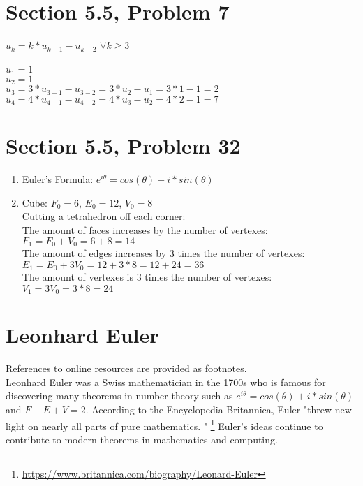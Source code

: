 \documentclass{article}
\begin{document}
\clearpage
\header
\section*{Section 5.5, Problem 7}
$u_k=k*u_{k-1}-u_{k-2}$ $\forall k \geq 3$ \\\\
$u_1=1$ \\
$u_2=1$ \\
$u_3=3*u_{3-1}-u_{3-2}=3*u_2-u_1=3*1-1=2$ \\
$u_4=4*u_{4-1}-u_{4-2}=4*u_3-u_2=4*2-1=7$

\section*{Section 5.5, Problem 32}

\clearpage
\header
\begin{enumerate}[5.1]
	\item Euler's Formula: $e^{i\theta}=cos(\theta)+i*sin(\theta)$
	\item Cube: $F_0=6$, $E_0=12$, $V_0=8$ \\
	Cutting a tetrahedron off each corner: \\
	The amount of faces increases by the number of vertexes: $F_1=F_0+V_0=6+8=14$ \\
	The amount of edges increases by 3 times the number of vertexes: $E_1=E_0+3V_0=12+3*8=12+24=36$ \\
	The amount of vertexes is 3 times the number of vertexes: $V_1=3V_0=3*8=24$
\end{enumerate}

\clearpage
\header

\section*{Leonhard Euler}

References to online resources are provided as footnotes. \\

Leonhard Euler was a Swiss mathematician in the 1700s who is famous for discovering many theorems in number theory such as $e^{i\theta} = cos(\theta)+i*sin(\theta)$ and $F-E+V=2$. According to the Encyclopedia Britannica, Euler "threw new light on nearly all parts of pure mathematics. "
\footnote{\url{https://www.britannica.com/biography/Leonard-Euler}}
Euler's ideas continue to contribute to modern theorems in mathematics and computing.
\end{document}
